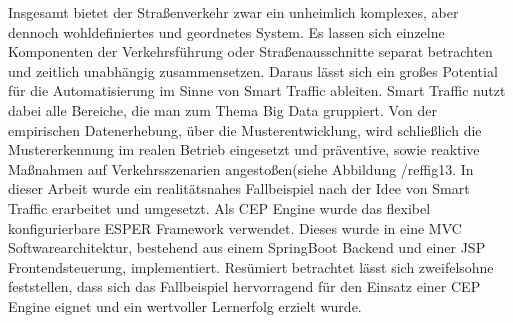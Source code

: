Insgesamt bietet der Straßenverkehr zwar ein unheimlich komplexes, aber dennoch wohldefiniertes und geordnetes System. Es lassen sich einzelne Komponenten der Verkehrsführung oder Straßenausschnitte separat betrachten und zeitlich unabhängig zusammensetzen. Daraus lässt sich ein großes Potential für die Automatisierung im Sinne von Smart Traffic ableiten. Smart Traffic nutzt dabei alle Bereiche, die man zum Thema Big Data gruppiert. Von der empirischen Datenerhebung, über die Musterentwicklung, wird schließlich die Mustererkennung im realen Betrieb eingesetzt und präventive, sowie reaktive Maßnahmen auf Verkehrsszenarien angestoßen(siehe Abbildung /ref{fig13}.
In dieser Arbeit wurde ein realitätsnahes Fallbeispiel nach der Idee von Smart Traffic erarbeitet und umgesetzt. Als CEP Engine wurde das flexibel konfigurierbare ESPER Framework verwendet. Dieses wurde in eine MVC  Softwarearchitektur, bestehend aus einem SpringBoot Backend und einer JSP  Frontendsteuerung, implementiert. Resümiert betrachtet lässt sich zweifelsohne feststellen, dass sich das Fallbeispiel hervorragend für den Einsatz einer CEP Engine eignet und ein wertvoller Lernerfolg erzielt wurde.



